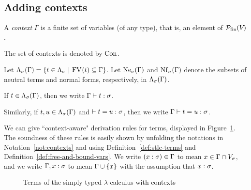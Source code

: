 \subsection{Adding contexts} \label{sec:contexts}

\begin{defn}[Context]
A \emph{context} $\Gamma$ is a finite set of variables (of any type), that is, an element of $\finpowset{\Var}$.
\end{defn}

\begin{notn} \label{not:contexts}
\hfill \vspace{-6pt}
\begin{items}
    \item The set of contexts is denoted by $\Con$.
    \item Let $\cTm{\Gamma}{\sigma} = \setof{t \in \Tm[\sigma]}{\FV{t} \subs \Gamma}$. Let $\cNe{\Gamma}{\sigma}$ and $\cNf{\Gamma}{\sigma}$ denote the subsets of neutral terms and normal forms, respectively, in $\cTm{\Gamma}{\sigma}$.
    \item If $t \in \cTm{\Gamma}{\sigma}$, then we write $\ctypedtm{\Gamma}{t}{\sigma}$.
    \item Similarly, if $t, u \in \cTm{\Gamma}{\sigma}$ and $\conv{t}{u}{\sigma}$, then we write $\ctypedconv{\Gamma}{t}{u}{\sigma}$.
\end{items}
\end{notn}

We can give ``context-aware" derivation rules for terms, displayed in Figure~\ref{fig:stlc-terms-with-contexts}. The soundness of these rules is easily shown by unfolding the notations in Notation~\ref{not:contexts} and using Definition~\ref{def:stlc-terms} and Definition~\ref{def:free-and-bound-vars}. We write $(\typedvar{x}{\sigma}) \in \Gamma$ to mean $x \in \Gamma \cap \Var[\sigma]$, and we write $\Gamma, \typedvar{x}{\sigma}$ to mean $\Gamma \cup \singset[x]$ with the assumption that $\typedvar{x}{\sigma}$.

\begin{figure}[ht]
\caption{Terms of the simply typed $\lambda$-calculus with contexts}
\label{fig:stlc-terms-with-contexts}
\end{figure}

